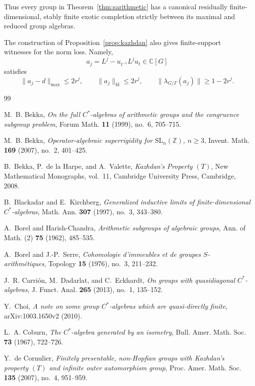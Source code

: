 \documentclass[11pt]{article}
\newcommand{\C}{\mathbb C}
\begin{document}
Thus every group in Theorem~\ref{thm:sarithmetic} has a canonical
residually finite-dimensional, stably finite exotic completion strictly
between its maximal and reduced group algebras.

The construction of Proposition~\ref{prop:kazhdan} also gives finite-support
witnesses for the norm loss.  Namely,
\[
 a_j=L^j-u_{t^{-1}}L^ju_t\in\C[G]
\]
satisfies
\[
 \|a_j-d\|_{\max}\leq2r^j,
 \qquad
 \|a_j\|_{\mathrm{fd}}\leq2r^j,
 \qquad
 \|\lambda_{G/\Gamma}(a_j)\|\geq1-2r^j.
\]

\begin{thebibliography}{99}

M.~B. Bekka,
\emph{On the full $C^*$-algebras of arithmetic groups and the congruence
subgroup problem},
Forum Math. \textbf{11} (1999), no.~6, 705--715.

M.~B. Bekka,
\emph{Operator-algebraic superrigidity for $\mathrm{SL}_n(\mathbb Z)$,
$n\geq3$},
Invent. Math. \textbf{169} (2007), no.~2, 401--425.

B.~Bekka, P.~de la Harpe, and A.~Valette,
\emph{Kazhdan's Property $(T)$},
New Mathematical Monographs, vol.~11, Cambridge University Press,
Cambridge, 2008.

B.~Blackadar and E.~Kirchberg,
\emph{Generalized inductive limits of finite-dimensional $C^*$-algebras},
Math. Ann. \textbf{307} (1997), no.~3, 343--380.

A.~Borel and Harish-Chandra,
\emph{Arithmetic subgroups of algebraic groups},
Ann. of Math. (2) \textbf{75} (1962), 485--535.

A.~Borel and J.-P.~Serre,
\emph{Cohomologie d'immeubles et de groupes $S$-arithm\'etiques},
Topology \textbf{15} (1976), no.~3, 211--232.

J.~R. Carri\'on, M.~Dadarlat, and C.~Eckhardt,
\emph{On groups with quasidiagonal $C^*$-algebras},
J. Funct. Anal. \textbf{265} (2013), no.~1, 135--152.

Y.~Choi,
\emph{A note on some group $C^*$-algebras which are quasi-directly finite},
arXiv:1003.1650v2 (2010).

L.~A. Coburn,
\emph{The $C^*$-algebra generated by an isometry},
Bull. Amer. Math. Soc. \textbf{73} (1967), 722--726.

Y.~de Cornulier,
\emph{Finitely presentable, non-Hopfian groups with Kazhdan's property
$(T)$ and infinite outer automorphism group},
Proc. Amer. Math. Soc. \textbf{135} (2007), no.~4, 951--959.


\end{thebibliography}
\end{document}
